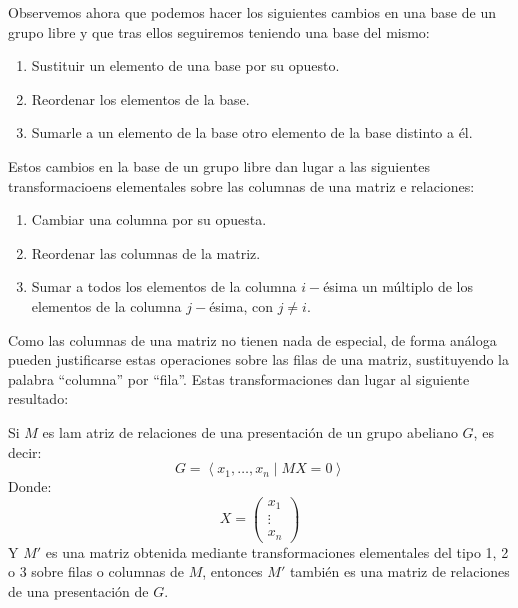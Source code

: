 \noindent
Observemos ahora que podemos hacer los siguientes cambios en una base de un grupo libre y que tras ellos seguiremos teniendo una base del mismo:
\begin{enumerate}
    \item Sustituir un elemento de una base por su opuesto.
    \item Reordenar los elementos de la base.
    \item Sumarle a un elemento de la base otro elemento de la base distinto a él.
\end{enumerate}
Estos cambios en la base de un grupo libre dan lugar a las siguientes transformacioens elementales sobre las columnas de una matriz e relaciones:
\begin{enumerate}
    \item Cambiar una columna por su opuesta.
    \item Reordenar las columnas de la matriz.
    \item Sumar a todos los elementos de la columna $i-$ésima un múltiplo de los elementos de la columna $j-$ésima, con $j\neq i$.
\end{enumerate}
Como las columnas de una matriz no tienen nada de especial, de forma análoga pueden justificarse estas operaciones sobre las filas de una matriz, sustituyendo la palabra ``columna'' por ``fila''. Estas transformaciones dan lugar al siguiente resultado:

\begin{prop}
    Si $M$ es lam atriz de relaciones de una presentación de un grupo abeliano $G$, es decir:
    \begin{equation*}
        G = \left\langle x_1,\ldots,x_n \mid MX = 0  \right\rangle 
    \end{equation*}
    Donde:
    \begin{equation*}
        X = \left(\begin{array}{c}
            x_1 \\
            \vdots \\
            x_n
        \end{array}\right)
    \end{equation*}
    Y $M'$ es una matriz obtenida mediante transformaciones elementales del tipo 1, 2 o 3 sobre filas o columnas de $M$, entonces $M'$ también es una matriz de relaciones de una presentación de $G$.
\end{prop}

